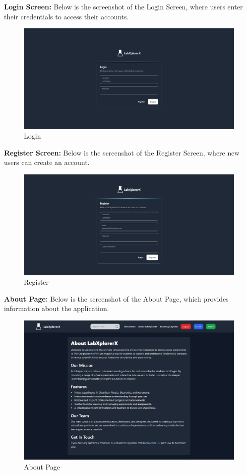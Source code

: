 \textbf{Login Screen:} Below is the screenshot of the Login Screen, where users enter their credentials to access their accounts.
\begin{figure}[H]
    \centering
    \includegraphics[width = 15cm]{Diagrams/output/login.png}
    \caption{Login}
\end{figure}
\newpage
\textbf{Register Screen:} Below is the screenshot of the Register Screen, where new users can create an account.
\begin{figure}[H]
    \centering
    \includegraphics[width = 16cm]{Diagrams/output/register.png}
    \caption{Register}
\end{figure}

\textbf{About Page:} Below is the screenshot of the About Page, which provides information about the application.
\begin{figure}[H]
    \centering
    \includegraphics[width = 16cm]{Diagrams/output/about.png}
    \caption{About Page}
\end{figure}
\newpage

